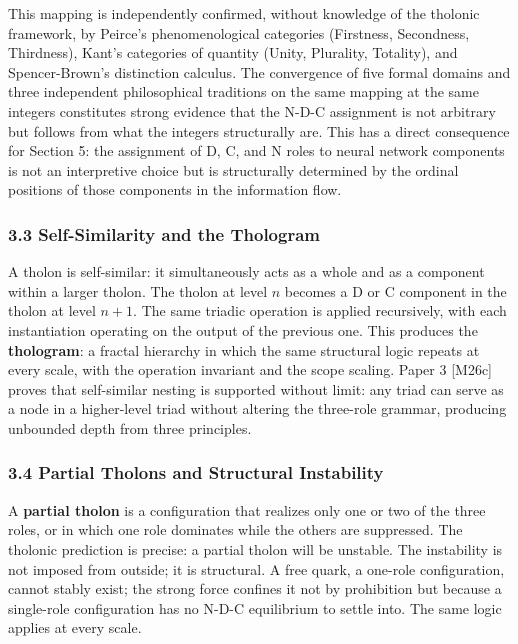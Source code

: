 \documentclass[
  11pt,
  letterpaper,
]{article}
\begin{document}
This mapping is independently confirmed, without knowledge of the
tholonic framework, by Peirce's phenomenological categories (Firstness,
Secondness, Thirdness), Kant's categories of quantity (Unity, Plurality,
Totality), and Spencer-Brown's distinction calculus. The convergence of
five formal domains and three independent philosophical traditions on
the same mapping at the same integers constitutes strong evidence that
the N-D-C assignment is not arbitrary but follows from what the integers
structurally are. This has a direct consequence for Section 5: the
assignment of D, C, and N roles to neural network components is not an
interpretive choice but is structurally determined by the ordinal
positions of those components in the information flow.

\subsubsection{3.3 Self-Similarity and the
Thologram}\label{self-similarity-and-the-thologram}

A tholon is self-similar: it simultaneously acts as a whole and as a
component within a larger tholon. The tholon at level \(n\) becomes a D
or C component in the tholon at level \(n+1\). The same triadic
operation is applied recursively, with each instantiation operating on
the output of the previous one. This produces the \textbf{thologram}: a
fractal hierarchy in which the same structural logic repeats at every
scale, with the operation invariant and the scope scaling. Paper 3
{[}M26c{]} proves that self-similar nesting is supported without limit:
any triad can serve as a node in a higher-level triad without altering
the three-role grammar, producing unbounded depth from three principles.

\subsubsection{3.4 Partial Tholons and Structural
Instability}\label{partial-tholons-and-structural-instability}

A \textbf{partial tholon} is a configuration that realizes only one or
two of the three roles, or in which one role dominates while the others
are suppressed. The tholonic prediction is precise: a partial tholon
will be unstable. The instability is not imposed from outside; it is
structural. A free quark, a one-role configuration, cannot stably exist;
the strong force confines it not by prohibition but because a
single-role configuration has no N-D-C equilibrium to settle into. The
same logic applies at every scale.
\end{document}
